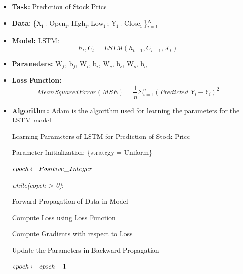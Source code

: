 \begin{itemize}
		
\item \textbf{Task: } Prediction of Stock Price
			
\item \textbf{Data: } \{X\textsubscript{i} : Open\textsubscript{i}, High\textsubscript{i}, Low\textsubscript{i} ; Y\textsubscript{i} : Close\textsubscript{i} \}$_{i =1}^{N}$		%
			
\item \textbf{Model: } LSTM: \begin{equation} h_{t}, C_{t} = LSTM(h_{t-1}, C_{t-1}, X_{t}) \end{equation} 	
			
\item \textbf{Parameters: } W$_{f}$, b$_{f}$, W$_{i}$, b$_{i}$, W$_{c}$,  b$_{c}$, W$_{o}$, b$_{o}$ 

\item \textbf{Loss Function: } \begin{equation}Mean Squared Error (MSE) =  \frac{1}{n}\Sigma_{i=1}^{n} (Predicted\_Y_{i} - Y_{i})^2 \end{equation}

\item \textbf{Algorithm: } Adam is the algorithm used for learning the parameters for the LSTM model.


\begin{algorithm}[H]

\caption{Learning Parameters of LSTM for Prediction of Stock Price}

\begin{algorithmic}[1] 
						
\STATE Parameter Initialization: \{strategy = Uniform\} 

\STATE $\emph{epoch} \gets Positive\_Integer$

\STATE \emph{while(eopch > 0)}:

\STATE \tab	Forward Propagation of Data in Model

\STATE \tab	Compute Loss using Loss Function

\STATE \tab	Compute Gradients with respect to Loss

\STATE \tab	Update the Parameters in Backward Propagation	

\STATE\tab	$\emph{epoch} \gets \emph{epoch}-1$

\end{algorithmic}

\end{algorithm}

\end{itemize}

